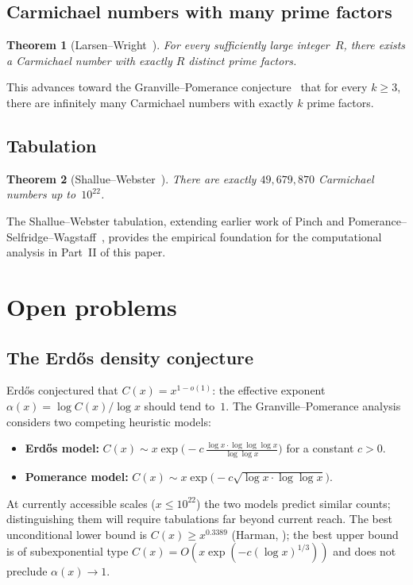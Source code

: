 \documentclass[12pt]{amsart}
\theoremstyle{plain}
\newtheorem{theorem}{Theorem}[section]
\theoremstyle{definition}
\theoremstyle{remark}
\begin{document}
\subsection{Carmichael numbers with many prime factors}

\begin{theorem}[Larsen--Wright~\cite{larsenwright2025}]
\label{thm:larsen_wright}
For every sufficiently large integer~$R$, there exists a Carmichael
number with exactly $R$ distinct prime factors.
\end{theorem}

This advances toward the Granville--Pomerance
conjecture~\cite{granvillepomerance2001} that for every $k\ge 3$,
there are infinitely many Carmichael numbers with exactly $k$ prime
factors.

\subsection{Tabulation}

\begin{theorem}[Shallue--Webster~\cite{shalluewebster2024}]
\label{thm:sw}
There are exactly $49{,}679{,}870$ Carmichael numbers up to~$10^{22}$.
\end{theorem}

The Shallue--Webster tabulation, extending earlier work of Pinch and
Pomerance--Selfridge--Wagstaff~\cite{psw1980}, provides the empirical
foundation for the computational analysis in Part~II of this paper.

\section{Open problems}\label{sec:open}

\subsection{The Erd\H{o}s density conjecture}\label{subsec:erdos_conj}

Erd\H{o}s conjectured that $C(x)=x^{1-o(1)}$: the effective exponent
$\alpha(x)=\log C(x)/\log x$ should tend to~$1$.  The
Granville--Pomerance analysis~\cite{granvillepomerance2001} considers
two competing heuristic models:
\begin{itemize}
\item \textbf{Erd\H{o}s model:}
  $C(x)\sim x\exp\bigl(-c\,\tfrac{\log x\cdot\log\log\log x}
  {\log\log x}\bigr)$ for a constant $c>0$.
\item \textbf{Pomerance model:}
  $C(x)\sim x\exp\bigl(-c\sqrt{\log x\cdot\log\log x}\bigr)$.
\end{itemize}
At currently accessible scales ($x\le 10^{22}$) the two models
predict similar counts; distinguishing them will require tabulations
far beyond current reach.  The best unconditional lower bound is
$C(x)\ge x^{0.3389}$ (Harman, ); the best upper
bound is of subexponential type $C(x)=O(x\exp(-c(\log x)^{1/3}))$
and does not preclude $\alpha(x)\to 1$.
\end{document}
